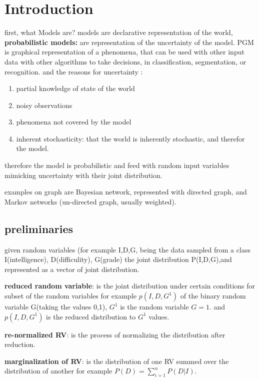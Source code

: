 \documentclass[4apaper,12pt]{book}
\begin{document}
  \section{Introduction}
  \begin{description}
  \item first, what Models are? models are declarative representation of the world, \textbf{probabilistic models:} are representation of the uncertainty of the model. PGM is graphical representation of a phenomena, that can be used with other input data with other algorithms to take decisions, in classification, segmentation, or  recognition. and the reasons for uncertainty : \begin{enumerate}
  \item partial knowledge of state of the world
  \item noisy observations
  \item phenomena not covered by the model
    \item inherent stochasticity: that the world is inherently stochastic, and therefor the model.
  \end{enumerate}
  \item therefore the model is probabilistic and feed with random input variables mimicking uncertainty with their joint distribution.
  \item examples on graph are Bayesian network, represented with directed graph, and Markov networks (un-directed graph, usually weighted).
    \subsection{preliminaries}
    \begin{description}
    \item given random variables (for example I,D,G, being the data sampled from a class I(intelligence), D(difficulity), G(grade) the joint distribution P(I,D,G),and represented as a vector of joint distribution.
    \item \textbf{reduced random variable}: is the joint distribution under certain conditions for subset of the random variables for example $p(I,D,G^1)$ of the binary random variable G(taking the values 0,1), $G^1$ is the random variable $G=1$. and $p(I,D,G^1)$ is the reduced distribution to $G^1$ values.
    \item \textbf{re-normalized RV}: is the process of normalizing the distribution after reduction.
    \item \textbf{marginalization of RV}: is the distribution of one RV summed over the distribution of another for example $P(D)=\sum_{i=1}^nP(D|I)$.

\end{description}
\end{description}
\end{document}
